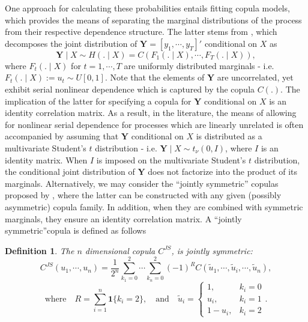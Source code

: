 \documentclass[harvard,11pt]{article}
\newtheorem{definition}{Definition}
\begin{document}
One approach for calculating these probabilities entails fitting copula models, which provides the means of separating the marginal distributions of the process from their respective dependence structure. The latter stems from \citet{sklar1959fonctions}, which decomposes the joint distribution of $\bm{Y}=[y_1,\cdots,y_T]'$ conditional on $X$ as
\[
\bm{Y}\mid X \sim H(.\mid X)=C\left(F_1(.\mid X),\cdots,F_T(.\mid X)\right),
\] 
where $F_t(.\mid X)$ for $t=1,\cdots,T$ are uniformly distributed marginals - i.e. $F_t(.\mid X):= u_t\sim U[0,1]$. Note that the elements of $\bm{Y}$ are uncorrelated, yet exhibit serial nonlinear dependence which is captured by the copula $C(.)$. The implication of the latter for specifying a copula for $\bm{Y}$ conditional on $X$ is an identity correlation matrix. As a result, in the literature, the means of allowing for nonlinear serial dependence for processes which are linearly unrelated is often accompanied by assuming that $\bm{Y}$ conditional on $X$ is distributed as a multivariate Student's $t$ distribution - i.e. $\bm{Y}\mid X\sim t_{\nu}(0,I)$, where $I$ is an identity matrix. When $I$ is imposed on the multivariate Student's $t$ distribution, the conditional joint distribution of $\bm{Y}$ does not factorize into the product of its marginals. Alternatively, we may consider the \textquotedblleft jointly symmetric\textquotedblright{ }copulas proposed by \citet{oh2016high}, where the latter can be constructed with any given (possibly asymmetric) copula family. In addition, when they are combined with symmetric marginals, they ensure an identity correlation matrix. A \textquotedblleft jointly symmetric\textquotedblright copula is defined as follows
\begin{definition}
The $n$ dimensional copula $C^{JS}$, is jointly symmetric:
\[
C^{JS}\left(u_1,\cdots,u_n\right)=\frac{1}{2^n}\sum\limits_{k_1=0}^{2}\cdots\sum\limits_{k_n=0}^{2}\left(-1\right)^R C(\tilde{u}_1,\cdots,\tilde{u}_i,\cdots,\tilde{u}_n),
\] 
\[
\text{where}\quad R=\sum\limits_{i=1}^n\bm{1}\{k_i=2\},\quad\text{and}\quad\tilde{u}_i=
\begin{cases}
1,& k_i=0\\
u_i,&k_i=1\\
1-u_i,& k_i=2
\end{cases}.
\]
 \end{definition}
\end{document}
